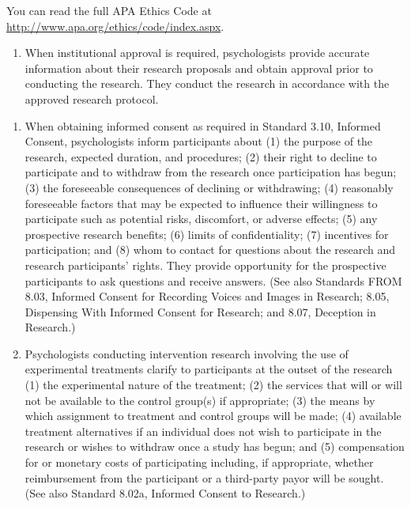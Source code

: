 \begin{fullwidth}


You can read the full APA Ethics Code at \url{http://www.apa.org/ethics/code/index.aspx}.


\begin{enumerate}

\item When institutional approval is required, psychologists provide accurate information about their research proposals and obtain approval prior to conducting the research. They conduct the research in accordance with the approved research protocol.

\end{enumerate}




\begin{enumerate}

\item When obtaining informed consent as required in Standard 3.10, Informed Consent, psychologists inform participants about (1) the purpose of the research, expected duration, and procedures; (2) their right to decline to participate and to withdraw from the research once participation has begun; (3) the foreseeable consequences of declining or withdrawing; (4) reasonably foreseeable factors that may be expected to influence their willingness to participate such as potential risks, discomfort, or adverse effects; (5) any prospective research benefits; (6) limits of confidentiality; (7) incentives for participation; and (8) whom to contact for questions about the research and research participants' rights. They provide opportunity for the prospective participants to ask questions and receive answers. (See also Standards
FROM 
8.03, Informed Consent for Recording Voices and Images in Research; 8.05, Dispensing With Informed Consent for Research; and 8.07, Deception in Research.)

\item Psychologists conducting intervention research involving the use of experimental treatments clarify to participants at the outset of the research (1) the experimental nature of the treatment; (2) the services that will or will not be available to the control group(s) if appropriate; (3) the means by which assignment to treatment and control groups will be made; (4) available treatment alternatives if an individual does not wish to participate in the research or wishes to withdraw once a study has begun; and (5) compensation for or monetary costs of participating including, if appropriate, whether reimbursement from the participant or a third-party payor will be sought. (See also Standard 8.02a, Informed Consent to Research.)


\end{enumerate}
\end{fullwidth}
